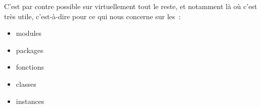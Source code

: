     C'est par contre possible sur virtuellement tout le reste, et notamment
là où c'est très utile, c'est-à-dire pour ce qui nous concerne sur les~:

\begin{itemize}
\tightlist
\item
  modules
\item
  packages
\item
  fonctions
\item
  classes
\item
  instances
\end{itemize}


    
    
    

